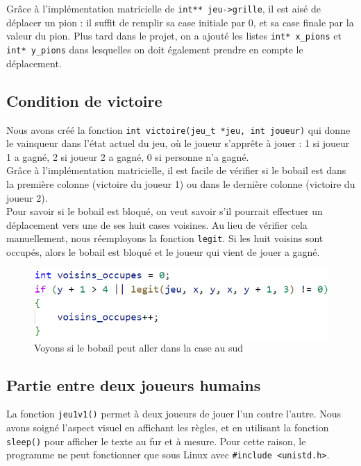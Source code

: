 \documentclass{article}
\begin{document}
\\ \\Grâce à l'implémentation matricielle de {\tt int** jeu->grille}, il est aisé de déplacer un pion :  il suffit de remplir sa case initiale par 0, et sa case finale par la valeur du pion. Plus tard dans le projet, on a ajouté les listes {\tt int* x\_pions} et {\tt int* y\_pions} dans lesquelles on doit également prendre en compte le déplacement.


\subsection{Condition de victoire}

Nous avons créé la fonction {\tt int victoire(jeu\_t *jeu, int joueur)} qui donne le vainqueur dans l'état actuel du jeu, où le joueur s'apprête à jouer : 1 si joueur 1 a gagné, 2 si joueur 2 a gagné, 0 si personne n'a gagné.
\\ Grâce à l'implémentation matricielle, il est facile de vérifier si le bobail est dans la première colonne (victoire du joueur 1) ou dans le dernière colonne (victoire du joueur 2).
\\ Pour savoir si le bobail est bloqué, on veut savoir s'il pourrait effectuer un déplacement vers une de ses huit cases voisines. Au lieu de vérifier cela manuellement, nous réemployons la fonction {\tt legit}. Si les huit voisins sont occupés, alors le bobail est bloqué et le joueur qui vient de jouer a gagné.

\begin{figure}[H]
    \centering
    \includegraphics[width=0.5\linewidth]{victoire.png}
    \caption{Voyons si le bobail peut aller dans la case au sud}
    \label{fig:1.2}
\end{figure}

\subsection{Partie entre deux joueurs humains}

La fonction {\tt jeu1v1()} permet à deux joueurs de jouer l'un contre l'autre. Nous avons soigné l'aspect visuel en affichant les règles, et en utilisant la fonction {\tt sleep()} pour afficher le texte au fur et à mesure. Pour cette raison, le programme ne peut fonctionner que sous Linux avec {\tt \#include <unistd.h>}.
\end{document}
